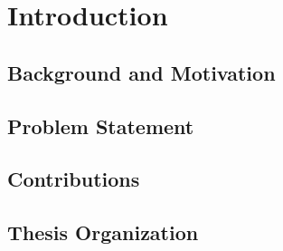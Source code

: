 
\chapter{Introduction}\label{ch:introduction}

\section{Background and Motivation}\label{sec:background}


\section{Problem Statement}\label{sec:problem_statement}


\section{Contributions}\label{sec:contributions}


\section{Thesis Organization}\label{sec:organization}

